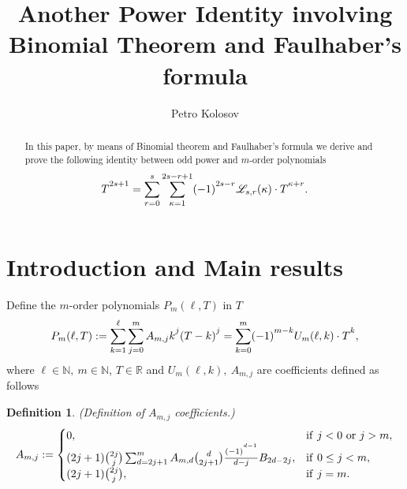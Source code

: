 \documentclass[11pt, letterpaper]{amsart} da da ya qq
\author[Petro Kolosov]{Petro Kolosov}
\title{Another Power Identity involving Binomial Theorem and Faulhaber's formula}
\theoremstyle{definition}
\newtheorem{defn}[thm]{Definition}
\theoremstyle{remark}
\numberwithin{equation}{section}
\begin{document}
\begin{abstract}
In this paper, by means of Binomial theorem and Faulhaber's formula we derive and prove the following identity
between odd power and $m$-order polynomials
$$T\strut^{2s+1}=\sum_{r=0}^{s}\sum_{\kappa=1}^{2s-r+1} (-1)\strut^{2s-r} \mathscr{L}_{s,r}(\kappa) \cdot T\strut^{\kappa+r}.$$
\end{abstract}
\maketitle
\tableofcontents
\section{Introduction and Main results}\label{intro}
Define the $m$-order polynomials $P_m(\ell,T)$ in $T$
\begin{equation}\label{f1}
P_m(\ell,T) := \sum_{k=1}^{\ell}\sum_{j=0}^m A_{m,j}k\strut^j(T-k)\strut^j=\sum_{k=0}^{m}(-1)\strut^{m-k}U_m(\ell, k)\cdot T\strut^k,
\end{equation}
where $\ell\in\mathbb{N}, \ m\in\mathbb{N}$, $T\in\mathbb{R}$ and $U_m(\ell, k), \ A_{m,j}$ are coefficients defined as follows
\begin{defn}\label{gen_13}
\textit{(Definition of $A_{m,j}$ coefficients.)}
\begin{equation*}
A_{m,j}:=
\begin{cases}
0, & \mathrm{if } \ j<0 \ \mathrm{or } \ j>m, \\
(2j+1)\binom{2j}{j} \sum_{d=2j+1}^{m} A_{m,d} \binom{d}{2j+1} \frac{(-1)\strut^{d-1}}{d-j} B_{2d-2j}, & \mathrm{if } \ 0 \leq j < m, \\
(2j+1)\binom{2j}{j}, & \mathrm{if } \ j=m. \\
\end{cases}
\end{equation*}
\end{defn}
\end{document}
